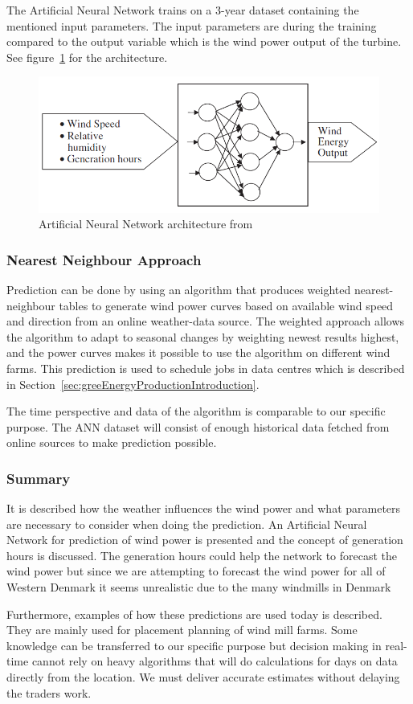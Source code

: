 The Artificial Neural Network trains on a 3-year dataset containing the mentioned input parameters. The input parameters are during the training compared to the output variable which is the wind power output of the turbine. See figure~\ref{fig:annArchitecture} for the architecture.
\\[0.5cm]
\begin{figure}[h!]
\centering
\includegraphics[width=0.7\linewidth,natwidth=898,natheight=587]{billeder/ANNwindSpeedPrediction.png}
\caption{Artificial Neural Network architecture from \cite{WindPowerGenerationUsingANN}}
\label{fig:annArchitecture}
\end{figure}

\subsubsection{Nearest Neighbour Approach}
Prediction can be done by using an algorithm that produces weighted nearest-neighbour tables to generate wind power curves based on available wind speed and direction from an online weather-data source. The weighted approach allows the algorithm to adapt to seasonal changes by weighting newest results highest, and the power curves makes it possible to use the algorithm on different wind farms. This prediction is used to schedule jobs in data centres which is described in Section~\ref{sec:greeEnergyProductionIntroduction}.

The time perspective and data of the algorithm is comparable to our specific purpose. The ANN dataset will consist of enough historical data fetched from online sources to make prediction possible.

\subsubsection{Summary}
It is described how the weather influences the wind power and what parameters are necessary to consider when doing the prediction. An Artificial Neural Network for prediction of wind power is presented and the concept of generation hours is discussed. The generation hours could help the network to forecast the wind power but since we are attempting to forecast the wind power for all of Western Denmark it seems unrealistic due to the many windmills in Denmark 

Furthermore, examples of how these predictions are used today is described. They are mainly used for placement planning of wind mill farms. Some knowledge can be transferred to our specific purpose but decision making in real-time cannot rely on heavy algorithms that will do calculations for days on data directly from the location. We must deliver accurate estimates without delaying the traders work.